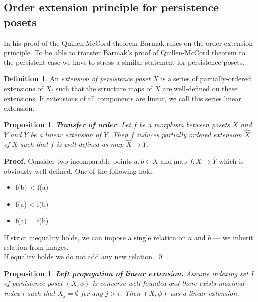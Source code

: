 \documentclass[english,12pt]{article}
\newcounter{stmcounter}[section]
\numberwithin{equation}{section}
\newtheorem{proposition}[stmcounter]{Proposition}
\theoremstyle{definition}
\newtheorem{definition}[stmcounter]{Definition}
\theoremstyle{remark}
\newenvironment{pf}{\noindent\textbf{Proof.}}{\qed}
\newcommand{\define}[1]{{\textit{#1}}}
\begin{document}
\subsection{Order extension principle for persistence posets}

In his proof of the Quillen-McCord theorem Barmak relies on the order extension principle. To be able to transfer Barmak's proof of Quillen-McCord theorem to the persistent case we have to stress a similar statement for persistence posets.

\begin{definition}
  An \define{extension of persistence poset} $X$ is a series of partially-ordered extensions of $X_i$ such that the structure maps of $X$ are well-defined on these extensions. If extensions of all components are linear, we call this series linear extension.
\end{definition}

\begin{proposition}
  \textbf{Transfer of order}. Let $f$ be a morphism between posets $X$ and $Y$ and $\overline{Y}$ be a linear extension of $Y$. Then $f$ induces partially ordered extension $\hat{X}$ of $X$ such that $f$ is well-defined as map $\hat{X} \to \overline{Y}$.
\end{proposition}

\begin{pf}
  Consider two incomparable points $a, b \in X$ and map $f : X \to \overline{Y}$ which is obviously well-defined. One of the following hold.\\
  \begin{itemize}
    \item f(b) < f(a)
    \item f(a) < f(b)
    \item f(a) = f(b)
  \end{itemize}
  If strict inequality holds, we can impose a single relation on $a$ and $b$ --- we inherit relation from images.\\
  If equality holds we do not add any new relation.
\end{pf}

\begin{proposition}
  \textbf{Left propagation of linear extension.} Assume indexing set $I$ of persistence poset $(X,\phi)$ is converse well-founded and there exists maximal index $i$ such that $X_j = \emptyset$ for any $j > i$. Then $(X,\phi)$ has a linear extension.
\end{proposition}
\end{document}
